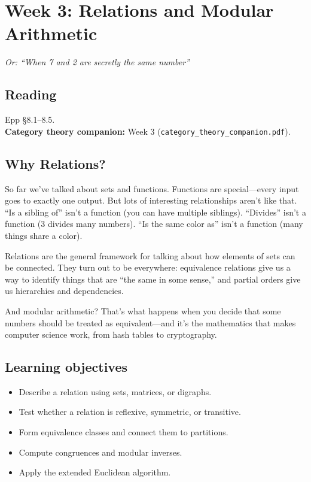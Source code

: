 \section{Week 3: Relations and Modular Arithmetic}

\textit{Or: ``When 7 and 2 are secretly the same number''}

\subsection*{Reading}
Epp \S 8.1--8.5.\\
\textbf{Category theory companion:} Week 3 (\texttt{category\_theory\_companion.pdf}).

\subsection*{Why Relations?}

So far we've talked about sets and functions. Functions are special---every input goes to exactly one output. But lots of interesting relationships aren't like that. ``Is a sibling of'' isn't a function (you can have multiple siblings). ``Divides'' isn't a function (3 divides many numbers). ``Is the same color as'' isn't a function (many things share a color).

Relations are the general framework for talking about how elements of sets can be connected. They turn out to be everywhere: equivalence relations give us a way to identify things that are ``the same in some sense,'' and partial orders give us hierarchies and dependencies.

And modular arithmetic? That's what happens when you decide that some numbers should be treated as equivalent---and it's the mathematics that makes computer science work, from hash tables to cryptography.

\subsection*{Learning objectives}
\begin{itemize}
  \item Describe a relation using sets, matrices, or digraphs.
  \item Test whether a relation is reflexive, symmetric, or transitive.
  \item Form equivalence classes and connect them to partitions.
  \item Compute congruences and modular inverses.
  \item Apply the extended Euclidean algorithm.
\end{itemize}

